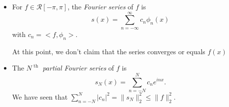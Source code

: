\begin{define}
	\hfill
	\begin{itemize}
		\item
		      For $f \in \mathscr{R}[-\pi,\pi]$, the \textit{Fourier series} of $f$ is
		      \[
			      s(x)=\sum_{n=-\infty}^{\infty}{c_n \phi_n(x)}
		      \] with $c_n= <f, \phi_n>$.
		      \begin{remark}
			      At this point, we don't claim that the series converges or equals $f(x)$
		      \end{remark}
		\item The \textit{$N^{\text{ th } }$ partial Fourier series} of  $f$ is \[
			      s_N(x)=\sum_{n=-N}^{N}{c_n e^{inx}}
			      .\]
		      We have seen that $\sum_{n=-N}^{N}{\left|c_{n}\right|^2}=\|s_N\|_{2}^2\le \|f\|_{2}^2$.
	\end{itemize}
\end{define}
